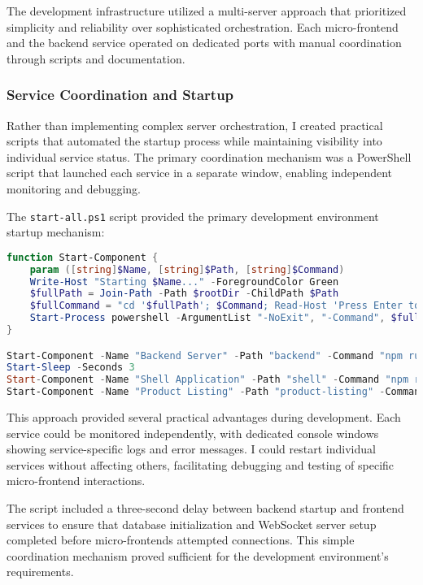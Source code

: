 \documentclass[12pt,a4paper]{report}
\begin{document}
The development infrastructure utilized a multi-server approach that prioritized simplicity and reliability over sophisticated orchestration. Each micro-frontend and the backend service operated on dedicated ports with manual coordination through scripts and documentation.

\subsubsection{Service Coordination and Startup}

Rather than implementing complex server orchestration, I created practical scripts that automated the startup process while maintaining visibility into individual service status. The primary coordination mechanism was a PowerShell script that launched each service in a separate window, enabling independent monitoring and debugging.

The \texttt{start-all.ps1} script provided the primary development environment startup mechanism:

\begin{lstlisting}[language=PowerShell, caption=Development Environment Startup Script]
function Start-Component {
    param ([string]$Name, [string]$Path, [string]$Command)
    Write-Host "Starting $Name..." -ForegroundColor Green
    $fullPath = Join-Path -Path $rootDir -ChildPath $Path
    $fullCommand = "cd '$fullPath'; $Command; Read-Host 'Press Enter to exit'"
    Start-Process powershell -ArgumentList "-NoExit", "-Command", $fullCommand
}

Start-Component -Name "Backend Server" -Path "backend" -Command "npm run dev"
Start-Sleep -Seconds 3
Start-Component -Name "Shell Application" -Path "shell" -Command "npm run serve"
Start-Component -Name "Product Listing" -Path "product-listing" -Command "npm run serve"
\end{lstlisting}

This approach provided several practical advantages during development. Each service could be monitored independently, with dedicated console windows showing service-specific logs and error messages. I could restart individual services without affecting others, facilitating debugging and testing of specific micro-frontend interactions.

The script included a three-second delay between backend startup and frontend services to ensure that database initialization and WebSocket server setup completed before micro-frontends attempted connections. This simple coordination mechanism proved sufficient for the development environment's requirements.
\end{document}
